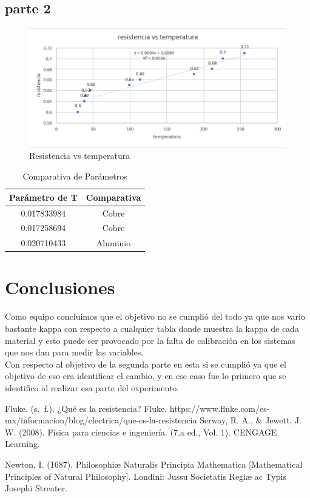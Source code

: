 \documentclass{article}
\begin{document}
\subsection*{parte 2}

\begin{figure}[H]
	\centering	
	\includegraphics[scale=0.5]{../imgs/tem.png}
	\caption{Resistencia vs temperatura}
	\label{fig:2}
\end{figure}

\begin{table}[ht]
    \centering
    \begin{tabular}{|c|c|}
    \hline
    Parámetro de T & Comparativa \\
    \hline
    0.017833984 & Cobre \\
    \hline
    0.017258694 & Cobre \\
    \hline
    0.020710433 & Aluminio \\
    \hline
    \end{tabular}
    \caption{Comparativa de Parámetros}
    \label{tabla:comparativa}
\end{table}


\section{Conclusiones}\label{Conclusiones}				%
Como equipo concluimos que el objetivo no se cumplió del todo ya que nos vario bastante kappa con respecto a cualquier tabla donde muestra la kappa de cada material
y esto puede ser provocado por la falta de calibración en los sistemas que nos dan para medir las variables. 
\\
Con respecto al objetivo de la segunda parte en esta si se cumplió ya que el objetivo de eso era identificar el cambio, y en ese caso fue lo primero que se identifico 
al realizar esa parte del experimento.
\begin{thebibliography}{9}						%
	Fluke. (s. f.). ¿Qué es la resistencia? Fluke. https://www.fluke.com/es-mx/informacion/blog/electrica/que-es-la-resistencia
	Serway, R. A., $\&$ Jewett, J. W. (2008). Física para ciencias e ingeniería. (7.a
ed., Vol. 1). CENGAGE Learning.

	Newton, I. (1687). Philosophiæ Naturalis Principia Mathematica [Mathematical Principles of Natural Philosophy]. Londini: Jussu Societatis Regiæ ac Typis Josephi Streater.

\end{thebibliography}
\end{document}
